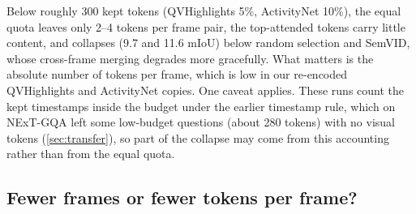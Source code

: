 Below roughly 300 kept tokens (QVHighlights 5\%, ActivityNet 10\%), the equal quota leaves only 2--4 tokens per frame
pair, the top-attended tokens carry little content, and \method collapses (9.7 and 11.6 mIoU) below random selection
and SemVID, whose cross-frame merging degrades more gracefully. What matters is the absolute number of tokens per
frame, which is low in our re-encoded QVHighlights and ActivityNet copies. One caveat applies. These runs count the
kept timestamps inside the budget under the earlier timestamp rule, which on NExT-GQA left some low-budget questions
(about 280 tokens) with no visual tokens (\cref{sec:transfer}), so part of the collapse may come from this accounting
rather than from the equal quota.

\subsection{Fewer frames or fewer tokens per frame?}
\label{sec:frames}


